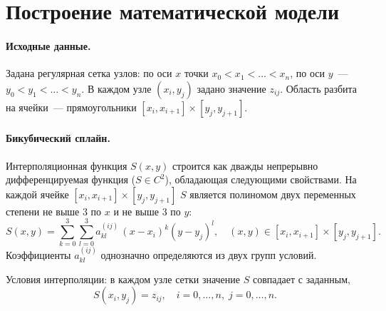 \documentclass[a4paper, 14pt]{extarticle}
\begin{document}
\section{Построение математической модели}

\paragraph{Исходные данные.} Задана регулярная сетка узлов: по оси $x$ точки $x_0 < x_1 < \ldots < x_n$, по оси $y$~--- $y_0 < y_1 < \ldots < y_n$. В каждом узле $(x_i, y_j)$ задано значение $z_{ij}$. Область разбита на ячейки~--- прямоугольники $[x_i, x_{i+1}] \times [y_j, y_{j+1}]$.

\paragraph{Бикубический сплайн.} Интерполяционная функция $S(x, y)$ строится как дважды непрерывно дифференцируемая функция ($S \in C^2$), обладающая следующими свойствами. На каждой ячейке $[x_i, x_{i+1}] \times [y_j, y_{j+1}]$ $S$ является полиномом двух переменных степени не выше 3 по $x$ и не выше 3 по $y$:
\begin{equation}
S(x, y) = \sum_{k=0}^{3} \sum_{l=0}^{3} a_{kl}^{(ij)} \, (x - x_i)^k (y - y_j)^l, \quad (x,y) \in [x_i, x_{i+1}] \times [y_j, y_{j+1}].
\label{eq:spline}
\end{equation}
Коэффициенты $a_{kl}^{(ij)}$ однозначно определяются из двух групп условий.

Условия интерполяции: в каждом узле сетки значение $S$ совпадает с заданным,
\begin{equation}
S(x_i, y_j) = z_{ij}, \quad i = 0, \ldots, n,\; j = 0, \ldots, n.
\end{equation}
\end{document}
